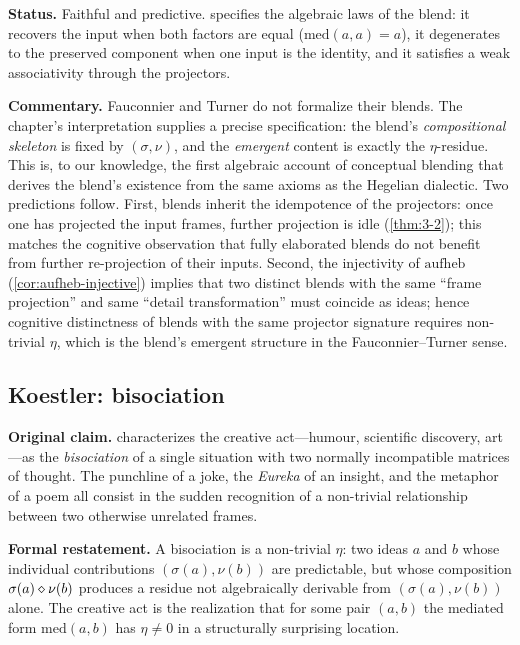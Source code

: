 \textbf{Status.} Faithful and predictive. 
specifies the algebraic laws of the blend: it recovers the input
when both factors are equal ($\mathrm{med}(a,a)=a$), it degenerates to
the preserved component when one input is the identity, and it
satisfies a weak associativity through the projectors.

\textbf{Commentary.} Fauconnier and Turner do not formalize their
blends. The chapter's interpretation supplies a precise
specification: the blend's \emph{compositional skeleton} is fixed by
$(\sigma,\nu)$, and the \emph{emergent} content is exactly the
$\eta$-residue. This is, to our knowledge, the first algebraic
account of conceptual blending that derives the blend's existence
from the same axioms as the Hegelian dialectic.  Two predictions
follow. First, blends inherit the idempotence of the projectors:
once one has projected the input frames, further projection is idle
(\cref{thm:3-2}); this matches the cognitive observation that fully
elaborated blends do not benefit from further re-projection of their
inputs. Second, the injectivity of $\mathrm{aufheb}$
(\cref{cor:aufheb-injective}) implies that two distinct blends with
the same ``frame projection'' and same ``detail transformation''
must coincide as ideas; hence cognitive distinctness of blends with
the same projector signature requires non-trivial $\eta$, which is
the blend's emergent structure in the Fauconnier--Turner sense.

\subsection*{Koestler: bisociation}

\textbf{Original claim.} \citet{Koestler1964} characterizes the
creative act---humour, scientific discovery, art---as the
\emph{bisociation} of a single situation with two normally
incompatible matrices of thought. The punchline of a joke, the
\emph{Eureka} of an insight, and the metaphor of a poem all consist
in the sudden recognition of a non-trivial relationship between two
otherwise unrelated frames.

\textbf{Formal restatement.} A bisociation is a non-trivial $\eta$:
two ideas $a$ and $b$ whose individual contributions $(\sigma(a),
\nu(b))$ are predictable, but whose composition
$\sigma(a)\mathbin{\diamond}\nu(b)$ produces a residue not algebraically
derivable from $(\sigma(a),\nu(b))$ alone. The creative act is the
realization that for some pair $(a,b)$ the mediated form
$\mathrm{med}(a,b)$ has $\eta\neq 0$ in a structurally surprising
location.


